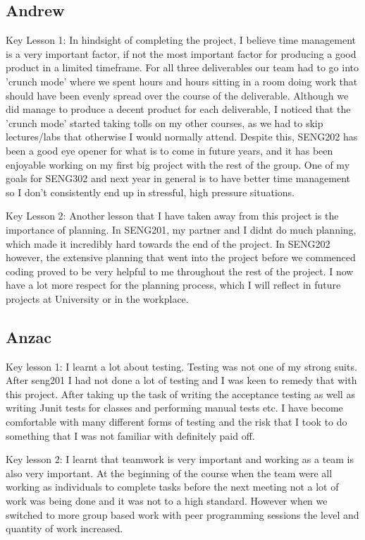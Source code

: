 \subsection{Andrew}
Key Lesson 1:
In hindsight of completing the project, I believe time management is a very important factor, if not the most important factor for producing a good product in a limited timeframe. For all three deliverables our team had to go into 'crunch mode' where we spent hours and hours sitting in a room doing work that should have been evenly spread over the course of the deliverable. Although we did manage to produce a decent product for each deliverable, I noticed that the 'crunch mode' started taking tolls on my other courses, as we had to skip lectures/labs that otherwise I would normally attend. Despite this, SENG202 has been a good eye opener for what is to come in future years, and it has been enjoyable working on my first big project with the rest of the group. One of my goals for SENG302 and next year in general is to have better time management so I don't consistently end up in stressful, high pressure situations.

Key Lesson 2:
Another lesson that I have taken away from this project is the importance of planning. In SENG201, my partner and I didnt do much planning, which made it incredibly hard towards the end of the project. In SENG202 however, the extensive planning that went into the project before we commenced coding proved to be very helpful to me throughout the rest of the project. I now have a lot more respect for the planning process, which I will reflect in future projects at University or in the workplace.

\subsection{Anzac}
Key lesson 1:
I learnt a lot about testing. Testing was not one of my strong suits. After seng201 I had not done a lot of testing and I was keen to remedy that with this project. After taking up the task of writing the acceptance testing as well as writing Junit tests for classes and performing manual tests etc. I have become comfortable with many different forms of testing and the risk that I took to do something that I was not familiar with definitely paid off.

Key lesson 2:
I learnt that teamwork is very important and working as a team is also very important. At the beginning of the course when the team were all working as individuals to complete tasks before the next meeting not a lot of work was being done and it was not to a high standard. However when we switched to more group based work with peer programming sessions the level and quantity of work increased. 


